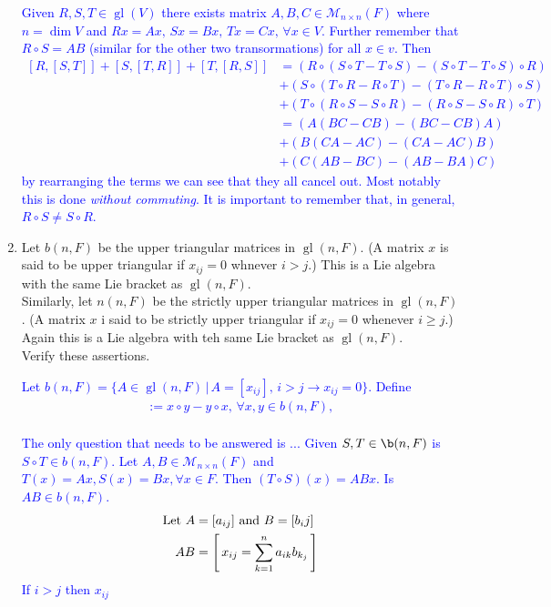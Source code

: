 \documentclass[12pt,a4paper]{report}
\newcommand{\BLUE}[1]{\textcolor{blue}{#1}}
\newcommand{\GL}{\operatorname{gl}}
\newcommand{\LB}[2]{\left [ #1,#2 \right ]}
\begin{document}
\begin{enumerate}[label=\textit{1.\arabic*}]
\newcommand{\GLLB}[2]{(#1\circ #2-#2\circ #1)}

\BLUE{Given $R,S,T \in \GL(V)$ there exists matrix $A,B,C \in \mathcal{M}_{n\times n}(F)$ where $n = \dim V$ and $Rx = Ax,\, Sx = Bx, \, Tx = Cx, \, \forall x \in V$.  Further remember that $R \circ S = AB$ (similar for the other two transormations) for all $x \in v$.  Then
\begin{align*}
	\LB{R}{\LB{S}{T}} + \LB{S}{\LB{T}{R}}+\LB{T}{\LB{R}{S}} &= \GLLB{R}{\GLLB{S}{T}} \\&+ \GLLB{S}{\GLLB{T}{R}}\\&+\GLLB{T}{\GLLB{R}{S}} \\
	&= (A(BC-CB)-(BC-CB)A)\\&+(B(CA-AC)-(CA-AC)B)\\&+(C(AB-BC)-(AB-BA)C)
\end{align*}by rearranging the terms we can see that they all cancel out.  Most notably this is done \textit{without commuting}.  It is important to remember that, in general, $R\circ S \ne S \circ R$.
}

\item Let $b(n,F)$ be the upper triangular matrices in $\GL(n, F)$.  (A matrix $x$ is said to be upper triangular if $x_{ij}=0$ whnever $i> j$.)  This is a Lie algebra with the same Lie bracket as $\GL(n,F)$.\\

Similarly, let $n(n,F)$ be the strictly upper triangular matrices in $\GL(n,F)$.  (A matrix $x$ i said to be strictly upper triangular if $x_{ij}=0$ whenever $i \ge j$.)  Again this is a Lie algebra with teh same Lie bracket as $\GL(n,F)$.\\

Verify these assertions.

\BLUE{Let $b(n,F) = \{A \in \GL(n,F)\,|\, A=[x_{ij}],\,i>j \to x_{ij}=0\}$. Define \begin{align*}
	[x,y] := x \circ y -y \circ x,\, \forall x,y \in b(n,F),
\end{align*}\\
The only question that needs to be answered is ... Given $S, T \in \b(n,F)$ is $S\circ T \in b(n,F)$.  Let $A,B \in \mathcal{M}_{n\times n}(F)$ and $T(x) = Ax, S(x)=Bx, \forall x \in F$.  Then $(T\circ S)(x) = ABx$.  Is $AB \in b(n,F)$.
\begin{align*}
	\text{Let } A &= [a_{ij}]\text{ and } B= [b_ij]\\
	AB &= \left [\, x_{ij} = \sum_{k=1}^n  a_{ik}b_{k_j} \,\right ]
\end{align*}If $i>j$ then $x_{ij}$
}


\end{enumerate}
\end{document}
